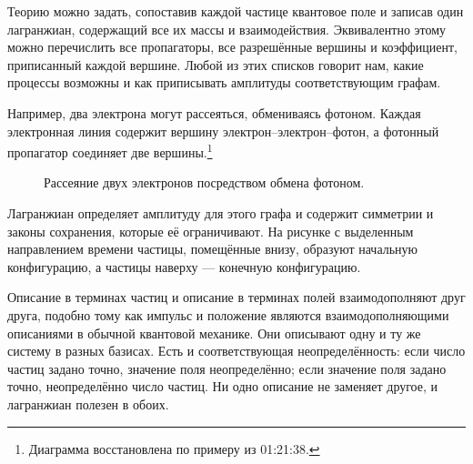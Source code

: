 Теорию можно задать, сопоставив каждой частице квантовое поле и записав один лагранжиан, содержащий все их массы и взаимодействия. Эквивалентно этому можно перечислить все пропагаторы, все разрешённые вершины и коэффициент, приписанный каждой вершине. Любой из этих списков говорит нам, какие процессы возможны и как приписывать амплитуды соответствующим графам.

Например, два электрона могут рассеяться, обмениваясь фотоном. Каждая электронная линия содержит вершину электрон--электрон--фотон, а фотонный пропагатор соединяет две вершины.\footnote{Диаграмма восстановлена по примеру из 01:21:38.}

\begin{figure}[htbp]
\centering
{}
\caption{Рассеяние двух электронов посредством обмена фотоном.}
\end{figure}

Лагранжиан определяет амплитуду для этого графа и содержит симметрии и законы сохранения, которые её ограничивают. На рисунке с выделенным направлением времени частицы, помещённые внизу, образуют начальную конфигурацию, а частицы наверху — конечную конфигурацию.

\begin{classroomqa}
\end{classroomqa}

Описание в терминах частиц и описание в терминах полей взаимодополняют друг друга, подобно тому как импульс и положение являются взаимодополняющими описаниями в обычной квантовой механике. Они описывают одну и ту же систему в разных базисах. Есть и соответствующая неопределённость: если число частиц задано точно, значение поля неопределённо; если значение поля задано точно, неопределённо число частиц. Ни одно описание не заменяет другое, и лагранжиан полезен в обоих.

\begin{classroomqa}
\end{classroomqa}

